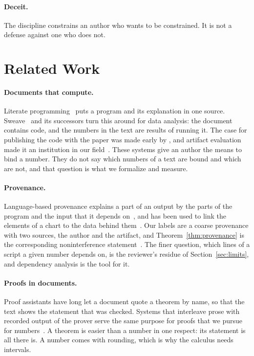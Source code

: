 \documentclass[acmsmall,nonacm,screen]{acmart}
\begin{document}
\paragraph{Deceit.} The discipline constrains an author who wants to be constrained. It is
not a defense against one who does not.

\section{Related Work}
\label{sec:related}

\paragraph{Documents that compute.} Literate programming~\citep{knuth1984} puts a program
and its explanation in one source. Sweave~\citep{leisch2002} and its successors turn this
around for data analysis: the document contains code, and the numbers in the text are
results of running it. The case for publishing the code with the paper was made early by
\citet{buckheit1995}, and artifact evaluation made it an institution in our
field~\citep{krishnamurthi2015}. These systems give an author the means to bind a number.
They do not say which numbers of a text are bound and which are not, and that question is
what we formalize and measure.

\paragraph{Provenance.} Language-based provenance explains a part of an output by the parts
of the program and the input that it depends on~\citep{perera2012}, and has been used to link
the elements of a chart to the data behind them~\citep{perera2022}. Our labels are a coarse
provenance with two sources, the author and the artifact, and
Theorem~\ref{thm:provenance} is the corresponding noninterference
statement~\citep{volpano1996}. The finer question, which lines of a script a given number
depends on, is the reviewer's residue of Section~\ref{sec:limits}, and dependency analysis
is the tool for it.

\paragraph{Proofs in documents.} Proof assistants have long let a document quote a theorem
by name, so that the text shows the statement that was checked. Systems that interleave
prose with recorded output of the prover serve the same purpose for proofs that we pursue
for numbers~\citep{pitclaudel2020}. A theorem is easier than a number in one respect: its
statement is all there is. A number comes with rounding, which is why the calculus needs
intervals.
\end{document}
